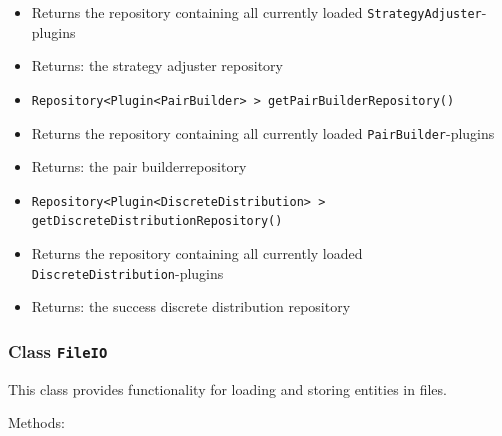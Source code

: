 \documentclass[parskip=full,11pt]{scrartcl}
\begin{document}
\begin{itemize}
	\item[]Returns the repository containing all currently loaded \texttt{StrategyAdjuster}-plugins
	\item[] Returns: the strategy adjuster repository
	\item\texttt{Repository<Plugin<PairBuilder>\,> getPairBuilderRepository()}
	\item[]Returns the repository containing all currently loaded \texttt{PairBuilder}-plugins
	\item[] Returns: the pair builderrepository
	\item\texttt{Repository<Plugin<DiscreteDistribution>\,> getDiscreteDistributionRepository()}
	\item[]Returns the repository containing all currently loaded \texttt{DiscreteDistribution}-plugins
	\item[] Returns: the success discrete distribution repository
\end{itemize}

\subsubsection{Class \texttt{FileIO}}

This class provides functionality for loading and storing entities in files.

Methods:
\end{document}
